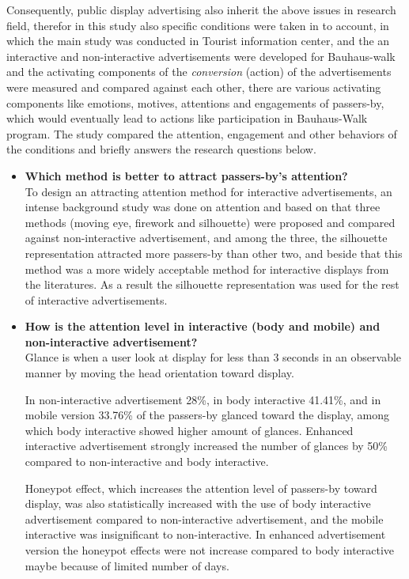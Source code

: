 Consequently, public display advertising also inherit the above issues in research field, therefor in this study also specific conditions were taken in to account, in which the main study was conducted in Tourist information center, and the an interactive and non-interactive advertisements were developed for Bauhaus-walk and the activating components of the \emph{conversion} (action) of the advertisements were measured and compared against each other, there are various activating components like emotions, motives, attentions and engagements of passers-by, which would eventually lead to actions like participation in Bauhaus-Walk program. The study compared the attention, engagement and other behaviors of the conditions and briefly answers the research questions below.




\begin{itemize}

\item \textbf{Which method is better to attract passers-by's attention?} \\
To design an attracting attention method for interactive advertisements, an intense background study was done on attention and based on that three methods (moving eye, firework and silhouette) were proposed and compared against non-interactive advertisement, and among the three, the silhouette representation attracted more passers-by than other two, and beside that this method was a more widely acceptable method for interactive displays from the literatures. As a result the silhouette representation was used for the rest of interactive advertisements.


\item \textbf{How is the attention level in interactive (body and mobile) and non-interactive advertisement?} \\
Glance is when a user look at display for less than 3 seconds in an observable manner by moving the head orientation toward display. 

In non-interactive advertisement 28\%, in body interactive 41.41\%, and in mobile version 33.76\% of the passers-by glanced toward the display, among which body interactive showed higher amount of glances. Enhanced interactive advertisement strongly increased the number of glances by 50\% compared to non-interactive and body interactive.

\iffalse
Honeypot effect, which increases the attention level of passers-by toward display, was also statistically increased with the use of body interactive advertisement compared to non-interactive advertisement, and the mobile interactive was insignificant to non-interactive. In enhanced advertisement version the honeypot effects were not increase compared to body interactive maybe because of limited number of days.


\end{itemize}
